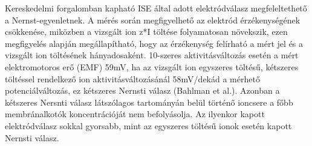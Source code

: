 {
Kereskedelmi forgalomban kapható ISE által adott elektródválasz megfeleltethető a Nernst-egyenletnek. A mérés során megfigyelhető az elektród érzékenységének csökkenése, miközben a vizsgált ion z*I töltése folyamatosan növekszik, ezen megfigyelés alapján megállapítható, hogy az érzékenység felírható a mért jel és a vizsgált ion töltésének hányadosaként. 10-szeres aktivitásváltozás esetén a mért elektromotoros erő (EMF) 59mV, ha az vizsgált ion egyszeres töltésű, kétszeres töltéssel rendelkező ion aktivitásváltozásánál 58mV/dekád a mérhető potenciálváltozás, ez kétszeres Nernsti válasz (Bahlman et al.). Azonban a kétszeres Nersnti válasz látszólagos tartományán belül történő ioncsere a főbb membránalkotók koncentrációját nem befolyásolja. Az ilyenkor kapott elektródválasz sokkal gyorsabb, mint az egyszeres töltésű ionok esetén kapott Nernsti válasz. 

}
